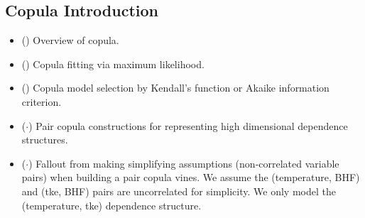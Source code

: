 \subsection{Copula Introduction}

\begin{itemize}
    \item (\checkmark) Overview of copula.
    \item (\checkmark) Copula fitting via maximum likelihood.
    \item (\checkmark) Copula model selection by Kendall's function or Akaike information criterion.
    \item ($\cdot$) Pair copula constructions for representing high dimensional dependence structures.
    \item ($\cdot$) Fallout from making simplifying assumptions (non-correlated variable pairs) when building
          a pair copula vines.  We assume the (temperature, BHF) and (tke, BHF) pairs are uncorrelated for simplicity.
          We only model the (temperature, tke) dependence structure.
\end{itemize}
